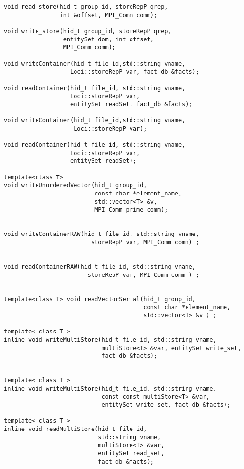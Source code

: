 \documentclass{article}
\begin{document}
\begin{lstlisting}
void read_store(hid_t group_id, storeRepP qrep,
                int &offset, MPI_Comm comm);

void write_store(hid_t group_id, storeRepP qrep, 
                 entitySet dom, int offset,
                 MPI_Comm comm);

void writeContainer(hid_t file_id,std::string vname,
                   Loci::storeRepP var, fact_db &facts);

void readContainer(hid_t file_id, std::string vname,
                   Loci::storeRepP var,
                   entitySet readSet, fact_db &facts);

void writeContainer(hid_t file_id,std::string vname,
                    Loci::storeRepP var);

void readContainer(hid_t file_id, std::string vname, 
                   Loci::storeRepP var,
                   entitySet readSet);

template<class T>
void writeUnorderedVector(hid_t group_id,
                          const char *element_name,
                          std::vector<T> &v,
                          MPI_Comm prime_comm);


void writeContainerRAW(hid_t file_id, std::string vname,
                         storeRepP var, MPI_Comm comm) ;

  
void readContainerRAW(hid_t file_id, std::string vname,
                        storeRepP var, MPI_Comm comm ) ;


template<class T> void readVectorSerial(hid_t group_id,
                                        const char *element_name,
                                        std::vector<T> &v ) ;

template< class T >
inline void writeMultiStore(hid_t file_id, std::string vname,
                            multiStore<T> &var, entitySet write_set,
                            fact_db &facts);


template< class T >
inline void writeMultiStore(hid_t file_id, std::string vname,
                            const const_multiStore<T> &var,
                            entitySet write_set, fact_db &facts);

template< class T >  
inline void readMultiStore(hid_t file_id,
                           std::string vname,
                           multiStore<T> &var,
                           entitySet read_set,
                           fact_db &facts); 

\end{lstlisting}
\end{document}

